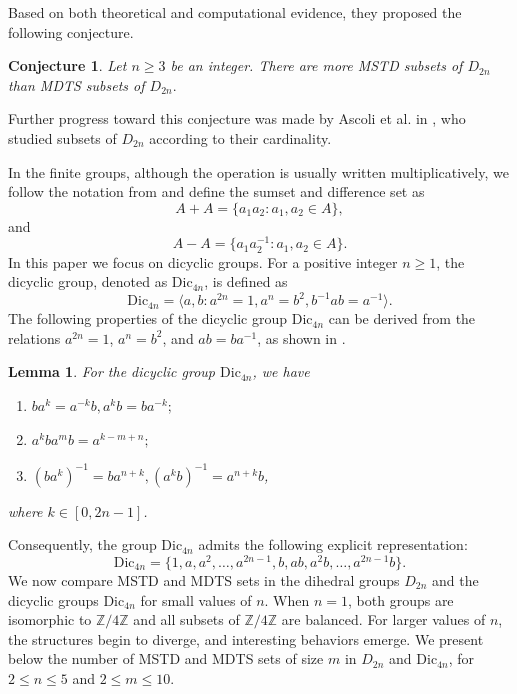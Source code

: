 \documentclass[11pt,reqno]{amsart}
\numberwithin{equation}{section}
\newtheorem{lemma}[theorem]{Lemma}
\newtheorem{conjecture}[theorem]{Conjecture}
\begin{document}
Based on both theoretical and computational evidence, they proposed the following conjecture.
\begin{conjecture}\textup{\cite{Miller_Vissuet_2014}}\label{millerconjecture} Let $n\geq3 $ be an integer. There are more MSTD subsets of $D_{2n}$ than MDTS subsets of $D_{2n}.$\end{conjecture} 
Further progress toward this conjecture was made by Ascoli et al. in \cite{Ascoli et al_2022}, who studied subsets of $D_{2n}$ according to their cardinality. 

 In the finite groups, although the operation is usually written multiplicatively, we follow the notation from  \cite{Miller_Vissuet_2014} and define the sumset and difference set as  $$A+A=\{a_1a_2: a_1,a_2\in A\},$$ and $$A-A =\{a_1a_2^{-1}: a_1,a_2 \in A\}.$$  
 In this paper we focus on dicyclic groups. For a positive integer $n\geq 1$, the dicyclic group, denoted as $\mathrm{Dic}_{4n}$, is defined as $$\mathrm{Dic}_{4n}= \langle a,b : a^{2n}=1, a^{n}=b^2, b^{-1}ab=a^{-1}\rangle.$$
 The following properties of the dicyclic group $\mathrm{Dic}_{4n}$ can be derived from the relations $a^{2n}=1$, $a^{n}=b^2$, and $ab=ba^{-1}$, as shown in \cite{Cheng_Feng_Huang_2019}.
\begin{lemma}\textup{\cite[Lemma 2.6]{Cheng_Feng_Huang_2019}}
    For the dicyclic group $\mathrm{Dic}_{4n}$, we have 
    \begin{enumerate}
        \item[\upshape(1)] $ba^{k}=a^{-k}b, a^{k}b=ba^{-k};$
        \item[\upshape(2)] $a^{k}ba^{m}b=a^{k-m+n};$
        \item[\upshape(3)] $(ba^{k})^{-1}=ba^{n+k}, (a^{k}b)^{-1}=a^{n+k}b$,
    \end{enumerate} where $k\in [0,2n-1]$.
\end{lemma}
Consequently, the group $\mathrm{Dic}_{4n}$ admits the following explicit representation:
 $$\mathrm{Dic}_{4n}=\{1, a,a^{2},\ldots, a^{2n-1}, b, ab, a^2b, \ldots, a^{2n-1}b \}.$$ 
 We now compare  MSTD and MDTS sets in the dihedral groups $D_{2n}$ and the dicyclic groups $\mathrm{Dic}_{4n}$ for small values of $n$.
When $n=1$, both groups are isomorphic to $\mathbb{Z}/4\mathbb{Z}$ and all subsets of $\mathbb{Z}/4\mathbb{Z}$ are balanced. For larger values of $n$, the structures begin to diverge, and interesting behaviors emerge. We present below the number of MSTD and MDTS sets of size $m$ in $D_{2n}$ and $\mathrm{Dic}_{4n}$, for $2\leq n\leq 5$ and $2\leq m\leq 10$. 
\end{document}
